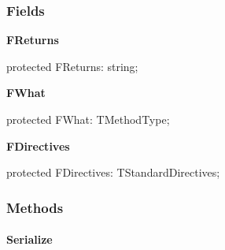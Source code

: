 \documentclass{report}
\newif\ifpdf
\begin{document}
\subsubsection*{\large{\textbf{Fields}}\normalsize\hspace{1ex}\hfill}
\begin{list}{}{
\setlength{\itemindent}{0cm}
\setlength{\listparindent}{0cm}
\setlength{\leftmargin}{\evensidemargin}
\addtolength{\leftmargin}{\tmplength}
\settowidth{\labelsep}{X}
\addtolength{\leftmargin}{\labelsep}
\setlength{\labelwidth}{\tmplength}
}
\label{PasDoc_Items.TPasMethod-FReturns}
\item[\textbf{FReturns}\hfill]
\ifpdf
\begin{flushleft}
\fi
\begin{ttfamily}
protected FReturns: string;\end{ttfamily}

\ifpdf
\end{flushleft}
\fi


\par  \label{PasDoc_Items.TPasMethod-FWhat}
\item[\textbf{FWhat}\hfill]
\ifpdf
\begin{flushleft}
\fi
\begin{ttfamily}
protected FWhat: TMethodType;\end{ttfamily}

\ifpdf
\end{flushleft}
\fi


\par  \label{PasDoc_Items.TPasMethod-FDirectives}
\item[\textbf{FDirectives}\hfill]
\ifpdf
\begin{flushleft}
\fi
\begin{ttfamily}
protected FDirectives: TStandardDirectives;\end{ttfamily}

\ifpdf
\end{flushleft}
\fi


\par  \end{list}
\subsubsection*{\large{\textbf{Methods}}\normalsize\hspace{1ex}\hfill}
\paragraph*{Serialize}\hspace*{\fill}
\end{document}
